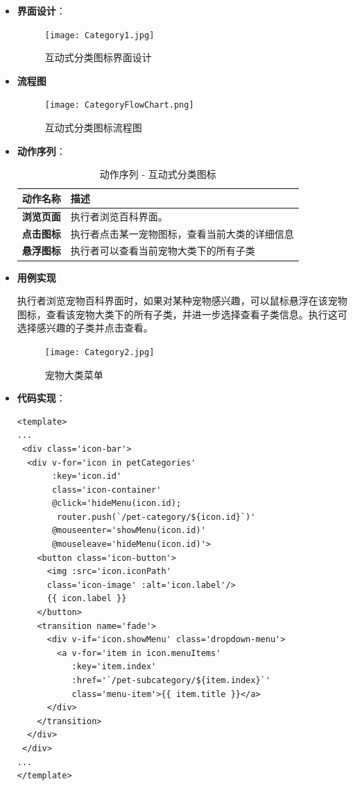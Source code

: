 \begin{itemize}
	\item \textbf{界面设计}：
	\begin{figure}[H]
		\centering
		\texttt{[image: Category1.jpg]}
		\caption{互动式分类图标界面设计}
		\label{Login}
	\end{figure}
	
	\item \textbf{流程图}
	
	\begin{figure}[H]
		\centering
		\texttt{[image: CategoryFlowChart.png]}
		\caption{互动式分类图标流程图}
		\label{fig:get}
	\end{figure}
	
	\item \textbf{动作序列}：
	\begin{table}[H]
		\centering
		\caption{动作序列 - 互动式分类图标}
		\renewcommand\arraystretch{1.5}
		\begin{tabular}{|c|>{\raggedright\arraybackslash}p{10cm}|}
			\hline
			\textbf{动作名称} & \textbf{描述} \\ \hline
			\textbf{浏览页面} & 执行者浏览百科界面。\\ \hline
			\textbf{点击图标} & 执行者点击某一宠物图标，查看当前大类的详细信息\\ \hline
			\textbf{悬浮图标} & 执行者可以查看当前宠物大类下的所有子类\\ \hline
		\end{tabular}
	\end{table}
	
	\item \textbf{用例实现}
	
	执行者浏览宠物百科界面时，如果对某种宠物感兴趣，可以鼠标悬浮在该宠物图标，查看该宠物大类下的所有子类，并进一步选择查看子类信息。执行这可选择感兴趣的子类并点击查看。
	
	\begin{figure}[H]
		\centering
		\texttt{[image: Category2.jpg]}
		\caption{宠物大类菜单}
		\label{宠物大类菜单}
	\end{figure}
	
	\item \textbf{代码实现}：
	\begin{verbatim}
<template>
...
 <div class='icon-bar'>
  <div v-for='icon in petCategories'
       :key='icon.id'
       class='icon-container'
       @click='hideMenu(icon.id);
        router.push(`/pet-category/${icon.id}`)'
       @mouseenter='showMenu(icon.id)'
       @mouseleave='hideMenu(icon.id)'>
    <button class='icon-button'>
      <img :src='icon.iconPath' 
      class='icon-image' :alt='icon.label'/>
      {{ icon.label }}
    </button>
    <transition name='fade'>
      <div v-if='icon.showMenu' class='dropdown-menu'>
        <a v-for='item in icon.menuItems'
           :key='item.index'
           :href='`/pet-subcategory/${item.index}`'
           class='menu-item'>{{ item.title }}</a>
      </div>
    </transition>
  </div>
 </div>
...
</template>
	\end{verbatim}
	

\end{itemize}
